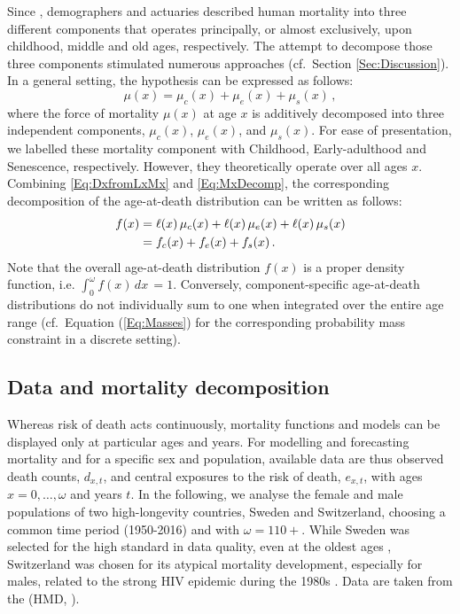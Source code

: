 \documentclass[11pt, a4paper]{article}
\begin{document}
Since \cite{thiele1871mathematical}, demographers and actuaries described human mortality into three different components that operates principally, or almost exclusively, upon childhood, middle and old ages, respectively. The attempt to decompose those three components stimulated numerous approaches (cf.~Section \ref{Sec:Discussion}). In a general setting, the hypothesis can be expressed as follows:
%
\begin{equation}\label{Eq:MxDecomp}
	\mu(x)=\mu_{c}(x)+\mu_{e}(x)+\mu_{s}(x)  \, ,
\end{equation}
%
where the force of mortality $\mu(x)$ at age $x$ is additively decomposed into three independent components, $\mu_{c}(x)$, $\mu_{e}(x)$, and $\mu_s(x)$. For ease of presentation, we labelled these mortality component with Childhood, Early-adulthood and Senescence, respectively. However, they theoretically operate over all ages $x$. Combining \eqref{Eq:DxfromLxMx} and \eqref{Eq:MxDecomp}, the corresponding decomposition of the age-at-death distribution can be written as follows: 
%
\begin{align}\label{Eq:FxDecom}
f(x) & = \ell(x)\,\mu_{c}(x) + \ell(x)\,\mu_{e}(x) + \ell(x)\,\mu_{s}(x) \notag \\
& = f_{c}(x)+f_{e}(x)+f_{s}(x) \, . 
\end{align}
%
Note that the overall age-at-death distribution $f(x)$ is a proper density function, i.e. $\int_{0}^{\omega} f(x)\,dx\, = 1$. Conversely, component-specific age-at-death distributions do not individually sum to one when integrated over the entire age range (cf.~Equation (\ref{Eq:Masses}) for the corresponding probability mass constraint in a discrete setting).

\subsection{Data and mortality decomposition}\label{Subsec:DataMortDecomp}
Whereas risk of death acts continuously, mortality functions and models can be displayed only at particular ages and years. For modelling and forecasting mortality and for a specific sex and population, available data are thus observed death counts, $d_{x,t}$, and central exposures to the risk of death, $e_{x,t}$, with ages $x=0,\dots,\omega$ and years $t$. In the following, we analyse the female and male populations of two high-longevity countries, Sweden and Switzerland, choosing a common time period (1950-2016) and with $\omega=110+$. While Sweden was selected for the high standard in data quality, even at the oldest ages \citep{vaupel1994longer,wilmoth1996extreme}, Switzerland was chosen for its atypical mortality development, especially for males, related to the strong HIV epidemic during the 1980s \citep{csete2012switzerland}. Data are taken from the \citeauthor{HMD} (HMD, \citeyear{HMD}). 
\end{document}
